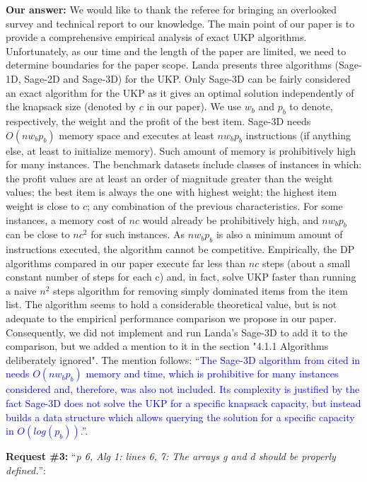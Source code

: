 \documentclass{elsarticle}
\begin{document}
\textbf{Our answer:} We would like to thank the referee for bringing an overlooked survey and technical report to our knowledge. The main point of our paper is to provide a comprehensive empirical analysis of exact UKP algorithms. Unfortunately, as our time and the length of the paper are limited, we need to determine boundaries for the paper scope. Landa presents three algorithms (Sage-1D, Sage-2D and Sage-3D) for the UKP. Only Sage-3D can be fairly considered an exact algorithm for the UKP as it gives an optimal solution independently of the knapsack size (denoted by \(c\) in our paper). We use \(w_b\) and \(p_b\) to denote, respectively, the weight and the profit of the best item. Sage-3D needs \(O(n w_b p_b)\) memory space and executes at least \(n w_b p_b\) instructions (if anything else, at least to initialize memory). Such amount of memory is prohibitively high for many instances. The benchmark datasets include classes of instances in which: the profit values are at least an order of magnitude greater than the weight values; the best item is always the one with highest weight; the highest item weight is close to \(c\); any combination of the previous characteristics. For some instances, a memory cost of \(nc\) would already be prohibitively high, and \(n w_b p_b\) can be close to \(n c^2\) for such instances. As \(n w_b p_b\) is also a minimum amount of instructions executed, the algorithm cannot be competitive. Empirically, the DP algorithms compared in our paper execute far less than \(nc\) steps (about a small constant number of steps for each c) and, in fact, solve UKP faster than running a naive \(n^2\) steps algorithm for removing simply dominated items from the item list. The algorithm seems to hold a considerable theoretical value, but is not adequate to the empirical performance comparison we propose in our paper. Consequently, we did not implement and run Landa's Sage-3D to add it to the comparison, but we added a mention to it in the section "4.1.1 Algorithms deliberately ignored". The mention follows: ``\textcolor{blue}{The Sage-3D algorithm from \cite{landa_sage} cited in \cite{ukp_hu_landa_shing_survey} needs \(O(n w_b p_b)\) memory and time, which is prohibitive for many instances considered and, therefore, was also not included.
Its complexity is justified by the fact Sage-3D does not solve the UKP for a specific knapsack capacity, but instead builds a data structure which allows querying the solution for a specific capacity in \(O(log(p_b))\).}''. 
\medskip

\textbf{Request \#3:} ``\textit{p 6, Alg 1: lines 6, 7: The arrays g and d should be properly defined.}'': 
\end{document}
